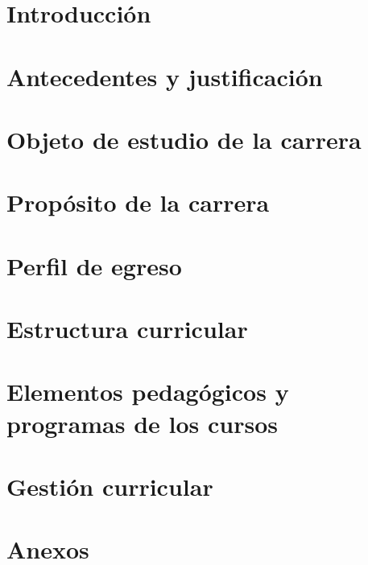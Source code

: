 \documentclass[11pt]{report}
\begin{document}

\tableofcontents


\clearpage

\chapter{Introducción}


\chapter{Antecedentes y justificación}


\chapter{Objeto de estudio de la carrera}


\chapter{Propósito de la carrera}


\chapter{Perfil de egreso}



\chapter{Estructura curricular}


\chapter{Elementos pedagógicos y programas de los cursos}



\chapter{Gestión curricular}


\chapter{Anexos}





\printbibliography[]
\end{document}
